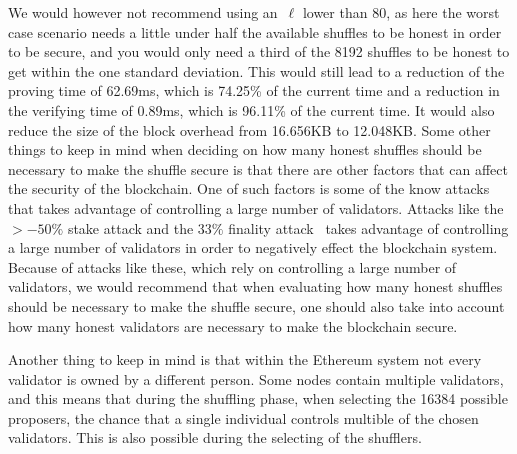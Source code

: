 We would however not recommend using an~$\ell$ lower than 80, as here the worst case scenario needs a little under half the available shuffles to be honest in order to be secure, and you would only need a third of the 8192 shuffles to be honest to get within the one standard deviation.
This would still lead to a reduction of the proving time of 62.69ms, which is 74.25\% of the current time and a reduction in the verifying time of 0.89ms, which is 96.11\% of the current time.
It would also reduce the size of the block overhead from 16.656KB to 12.048KB.
Some other things to keep in mind when deciding on how many honest shuffles should be necessary to make the shuffle secure is that there are other factors that can affect the security of the blockchain.
One of such factors is some of the know attacks that takes advantage of controlling a large number of validators.
Attacks like the $>-50\%$ stake attack and the $33\%$ finality attack~\cite{EthereumAttackDefense2024} takes advantage of controlling a large number of validators in order to negatively effect the blockchain system.
Because of attacks like these, which rely on controlling a large number of validators, we would recommend that when evaluating how many honest shuffles should be necessary to make the shuffle secure, one should also take into account how many honest validators are necessary to make the blockchain secure.

Another thing to keep in mind is that within the Ethereum system not every validator is owned by a different person.
Some nodes contain multiple validators, and this means that during the shuffling phase, when selecting the 16384 possible proposers, the chance that a single individual controls multible of the chosen validators.
This is also possible during the selecting of the shufflers.



